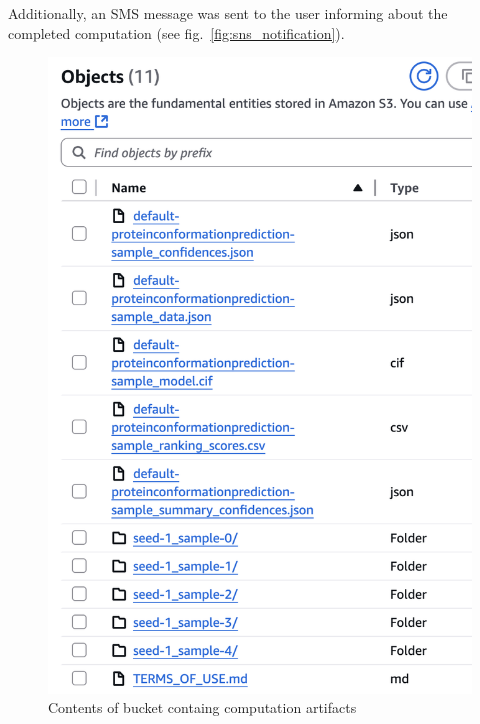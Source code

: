 Additionally, an SMS message was sent to the user informing about the completed computation (see fig.~\ref{fig:sns_notification}).

\begin{figure}[htbp]
    \centering
    \includegraphics[width=\textwidth]{images/bucket2}
    \caption{Contents of bucket containg computation artifacts}
    \label{fig:bucket}
\end{figure}


